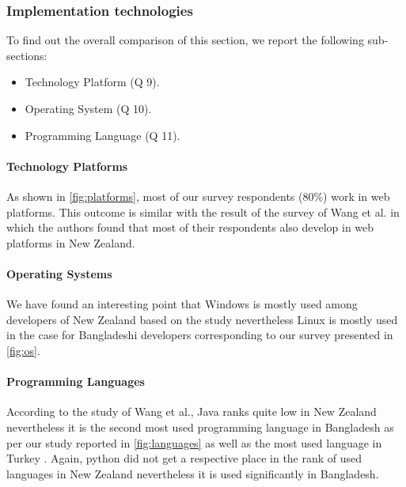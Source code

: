 \subsubsection{Implementation technologies}
\label{implementaion_techonologies_comparison}

To find out the overall comparison of this section, we report the following sub-sections:
\begin{itemize}
\item Technology Platform (Q 9).
\item Operating System (Q 10).
\item Programming Language (Q 11).
\end{itemize}


\paragraph{Technology Platforms}
As shown in \ref{fig:platforms}, most of our survey respondents (80\%) work in web platforms. This outcome is similar with the result of the survey of Wang et al. \cite{Wang2018} in which the authors found that most of their respondents also develop in web platforms in New Zealand.


\paragraph{Operating Systems}
We have found an interesting point that Windows is mostly used among developers of New Zealand based on the study \cite{Wang2018} nevertheless Linux is mostly used in the case for Bangladeshi developers corresponding to our survey presented in \ref{fig:os}.


\paragraph{Programming Languages}
According to the study of Wang et al.\cite{Wang2018}, Java ranks quite low in New Zealand nevertheless it is the second most used programming language in Bangladesh as per our study reported in \ref{fig:languages} as well as the most used language in Turkey \cite{Garousi2015}. Again, python did not get a respective place in the rank of used languages in New Zealand nevertheless it is used significantly in Bangladesh.
